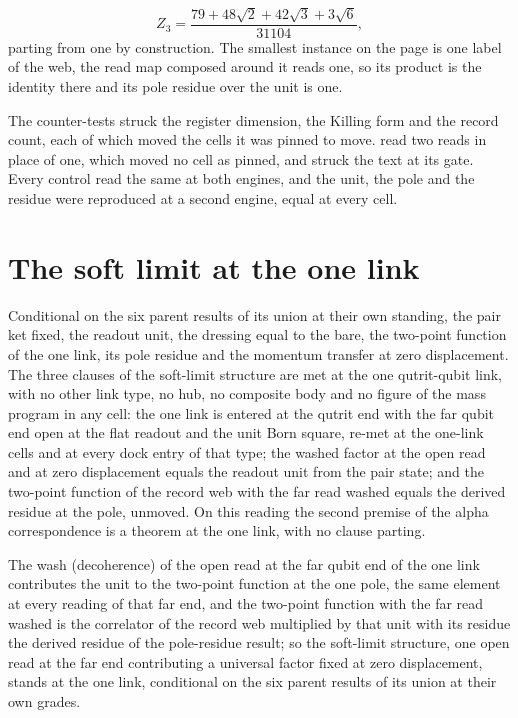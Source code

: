 \begin{chproof}
\begin{equation}
Z_{3} = \frac{79 + 48\sqrt{2} + 42\sqrt{3} + 3\sqrt{6}}{31104} ,
\end{equation}
parting from one by construction. The smallest instance on the page is one label of the web, the read map composed around it reads one, so its product is the identity there and its pole residue over the unit is one.

The counter-tests struck the register dimension, the Killing form and the record count, each of which moved the cells it was pinned to move. read two reads in place of one, which moved no cell as pinned, and struck the text at its gate. Every control read the same at both engines, and the unit, the pole and the residue were reproduced at a second engine, equal at every cell.
\end{chproof}
\section{The soft limit at the one link}\label{mod:I-2-D535494-olsl-t1}
\begin{chconditional}\label{box:I-2-D535494-olsl-t1:1}
Conditional on the six parent results of its union at their own standing, the pair ket fixed, the readout unit, the dressing equal to the bare, the two-point function of the one link, its pole residue and the momentum transfer at zero displacement.
The three clauses of the soft-limit structure are met at the one qutrit-qubit link, with no other link type, no hub, no composite body and no figure of the mass program in any cell: the one link is entered at the qutrit end with the far qubit end open at the flat readout and the unit Born square, re-met at the one-link cells and at every dock entry of that type; the washed factor at the open read and at zero displacement equals the readout unit from the pair state; and the two-point function of the record web with the far read washed equals the derived residue at the pole, unmoved. On this reading the second premise of the alpha correspondence is a theorem at the one link, with no clause parting.
\end{chconditional}
The wash (decoherence) of the open read at the far qubit end of the one link contributes the unit to the two-point function at the one pole, the same element at every reading of that far end, and the two-point function with the far read washed is the correlator of the record web multiplied by that unit with its residue the derived residue of the pole-residue result; so the soft-limit structure, one open read at the far end contributing a universal factor fixed at zero displacement, stands at the one link, conditional on the six parent results of its union at their own grades.

